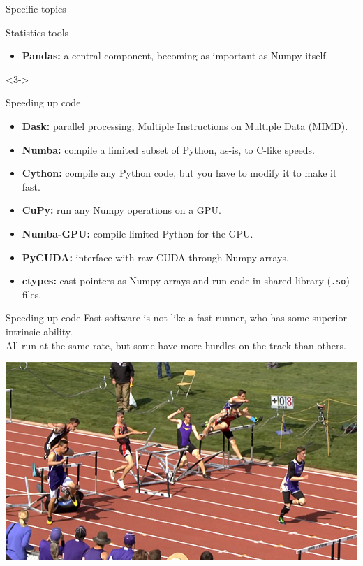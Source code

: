 \documentclass[aspectratio=169]{beamer}
\begin{document}
\begin{frame}{Specific topics}
\vspace{0.3 cm}
\begin{block}{Statistics tools}
\begin{itemize}
\item {\bf Pandas:} a central component, becoming as important as Numpy itself.
\end{itemize}

\end{block}

\vspace{0.4 cm}
\begin{uncoverenv}<3->
\begin{block}{Speeding up code}
\begin{itemize}
\item {\bf Dask:} parallel processing; \underline{M}ultiple \underline{I}nstructions on \underline{M}ultiple \underline{D}ata (MIMD).
\item {\bf Numba:} compile a limited subset of Python, as-is, to C-like speeds.
\item {\bf Cython:} compile any Python code, but you have to modify it to make it fast.
\item {\bf CuPy:} run any Numpy operations on a GPU.
\item {\bf Numba-GPU:} compile limited Python for the GPU.
\item {\bf PyCUDA:} interface with raw CUDA through Numpy arrays.
\item {\bf ctypes:} cast pointers as Numpy arrays and run code in shared library ({\tt\small *.so}) files.
\end{itemize}
\end{block}
\end{uncoverenv}
\end{frame}

\begin{frame}{Speeding up code}
\vspace{0.5 cm}
Fast software is not like a fast runner, who has some superior intrinsic ability. \\ All run at the same rate, but some have more hurdles on the track than others.

\vspace{0.25 cm}
\begin{center}
\includegraphics[width=0.7\linewidth]{hurdle9.jpg}
\end{center}
\end{frame}
\end{document}
